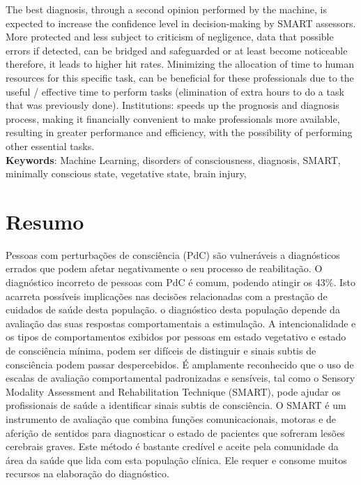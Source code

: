 The best diagnosis, through a second opinion performed by the machine, is expected to increase the confidence level in decision-making by SMART assessors. More protected and less subject to criticism of negligence, data that possible errors if detected, can be bridged and safeguarded or at least become noticeable therefore, it leads to higher hit rates. Minimizing the allocation of time to human resources for this specific task, can be beneficial for these professionals due to the useful / effective time to perform tasks (elimination of extra hours to do a task that was previously done).
Institutions: speeds up the prognosis and diagnosis process, making it financially convenient to make professionals more available, resulting in greater performance and efficiency, with the possibility of performing other essential tasks.\\


\vspace*{10mm}\noindent
\textbf{Keywords}: Machine Learning, disorders of consciousness, diagnosis, SMART, minimally conscious state, vegetative state, brain injury,

\chapter*{Resumo}
\hspace{4em} Pessoas com perturbações de consciência (PdC) são vulneráveis a diagnósticos errados que podem afetar negativamente o seu processo de reabilitação. O diagnóstico incorreto de pessoas com PdC é comum, podendo atingir os 43\%. Isto acarreta possíveis implicações nas decisões relacionadas com a prestação de cuidados de saúde desta população. o diagnóstico desta população depende da avaliação das suas respostas comportamentais a estimulação. A intencionalidade e os tipos de comportamentos exibidos por pessoas em estado vegetativo e estado de consciência mínima, podem ser difíceis de distinguir e sinais subtis de consciência podem passar despercebidos. É amplamente reconhecido que o uso de escalas de avaliação comportamental padronizadas e sensíveis, tal como o Sensory Modality Assessment and Rehabilitation Technique (SMART), pode ajudar os profissionais de saúde a identificar sinais subtis de consciência. 
O SMART é um instrumento de avaliação que combina funções comunicacionais, motoras e de aferição de sentidos para diagnosticar o estado de pacientes que sofreram lesões cerebrais graves. Este método é bastante credível e aceite pela comunidade da área da saúde  que lida com esta população clínica. Ele requer e consome muitos recursos na elaboração do diagnóstico.

